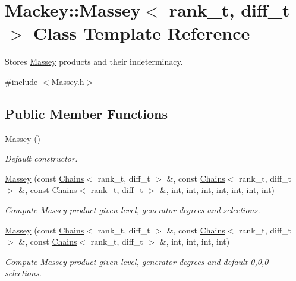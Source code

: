\hypertarget{classMackey_1_1Massey}{}\section{Mackey\+:\+:Massey$<$ rank\+\_\+t, diff\+\_\+t $>$ Class Template Reference}
\label{classMackey_1_1Massey}


Stores \hyperlink{classMackey_1_1Massey}{Massey} products and their indeterminacy.  




{\ttfamily \#include $<$Massey.\+h$>$}

\subsection*{Public Member Functions}
\begin{DoxyCompactItemize}
\item 
\hyperlink{classMackey_1_1Massey_a9e48aaa79f409e96ae2051719710315c}{Massey} ()
\begin{DoxyCompactList}\small\item\em Default constructor. \end{DoxyCompactList}\item 
\hyperlink{classMackey_1_1Massey_aea86037b138dc1c2682f5522279e551e}{Massey} (const \hyperlink{classMackey_1_1Chains}{Chains}$<$ rank\+\_\+t, diff\+\_\+t $>$ \&, const \hyperlink{classMackey_1_1Chains}{Chains}$<$ rank\+\_\+t, diff\+\_\+t $>$ \&, const \hyperlink{classMackey_1_1Chains}{Chains}$<$ rank\+\_\+t, diff\+\_\+t $>$ \&, int, int, int, int, int, int, int)
\begin{DoxyCompactList}\small\item\em Compute \hyperlink{classMackey_1_1Massey}{Massey} product given level, generator degrees and selections. \end{DoxyCompactList}\item 
\hyperlink{classMackey_1_1Massey_a40730505997c03b7c5c05e022ea23f47}{Massey} (const \hyperlink{classMackey_1_1Chains}{Chains}$<$ rank\+\_\+t, diff\+\_\+t $>$ \&, const \hyperlink{classMackey_1_1Chains}{Chains}$<$ rank\+\_\+t, diff\+\_\+t $>$ \&, const \hyperlink{classMackey_1_1Chains}{Chains}$<$ rank\+\_\+t, diff\+\_\+t $>$ \&, int, int, int, int)
\begin{DoxyCompactList}\small\item\em Compute \hyperlink{classMackey_1_1Massey}{Massey} product given level, generator degrees and default 0,0,0 selections. \end{DoxyCompactList}\end{DoxyCompactItemize}
